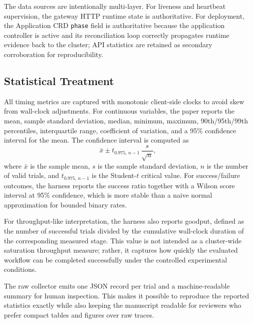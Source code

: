 The data sources are intentionally multi-layer. For liveness and heartbeat supervision, the gateway HTTP runtime state is authoritative. For deployment, the Application CRD \texttt{phase} field is authoritative because the application controller is active and its reconciliation loop correctly propagates runtime evidence back to the cluster; API statistics are retained as secondary corroboration for reproducibility.

\subsection{Statistical Treatment}
All timing metrics are captured with monotonic client-side clocks to avoid skew from wall-clock adjustments. For continuous variables, the paper reports the mean, sample standard deviation, median, minimum, maximum, 90th/95th/99th percentiles, interquartile range, coefficient of variation, and a 95\% confidence interval for the mean. The confidence interval is computed as
\begin{equation}
\bar{x} \pm t_{0.975,\,n-1}\,\frac{s}{\sqrt{n}},
\end{equation}
where $\bar{x}$ is the sample mean, $s$ is the sample standard deviation, $n$ is the number of valid trials, and $t_{0.975,\,n-1}$ is the Student-$t$ critical value. For success/failure outcomes, the harness reports the success ratio together with a Wilson score interval at 95\% confidence, which is more stable than a naive normal approximation for bounded binary rates.

For throughput-like interpretation, the harness also reports goodput, defined as the number of successful trials divided by the cumulative wall-clock duration of the corresponding measured stage. This value is not intended as a cluster-wide saturation throughput measure; rather, it captures how quickly the evaluated workflow can be completed successfully under the controlled experimental conditions.

The raw collector emits one JSON record per trial and a machine-readable summary for human inspection. This makes it possible to reproduce the reported statistics exactly while also keeping the manuscript readable for reviewers who prefer compact tables and figures over raw traces.

